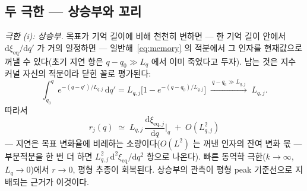 \documentclass[11pt,a4paper]{article}
\newcommand{\dd}{\mathrm{d}}
\newcommand{\eq}{\mathrm{eq}}
\begin{document}
\subsection{두 극한 — 상승부와 꼬리}
\emph{극한 (i): 상승부.} 목표가 기억 길이에 비해 천천히 변하면 — 한 기억 길이 안에서
$\dd\xi_{\eq}/\dd q'$ 가 거의 일정하면 — 일반해~\eqref{eq:memory} 의 적분에서 그 인자를 현재값으로
꺼낼 수 있다(초기 지연 항은 $q-q_0\gg L_q$ 에서 이미 죽었다고 두자). 남는 것은 지수 커널 자신의
적분이라 닫힌 꼴로 평가된다:
\begin{equation}
\int_{q_0}^{q}e^{-(q-q')/L_{q,j}}\,\dd q'
=L_{q,j}\Big[1-e^{-(q-q_0)/L_{q,j}}\Big]
\;\xrightarrow{\ q-q_0\gg L_{q,j}\ }\;L_{q,j}.
\label{eq:kernelint}
\end{equation}
따라서
\begin{equation}
r_j(q)\;\simeq\;L_{q,j}\,\frac{\dd\xi_{\eq,j}}{\dd q}\bigg|_{q}\;+\;O(L_{q,j}^2)
\label{eq:risefollow}
\end{equation}
— 지연은 목표 변화율에 비례하는 소량이다($O(L^2)$ 는 꺼낸 인자의 잔여 변화 몫 — 부분적분을 한 번 더
하면 $L_{q,j}^2\,\dd^2\xi_{\eq}/\dd q^2$ 항으로 나온다). 빠른 동역학 극한($k\to\infty$,
$L_q\to0$)에서 $r\to0$, 평형 추종이 회복된다. 상승부의 관측이 평형 peak 기준선으로 지배되는 근거가
이것이다.
\end{document}

